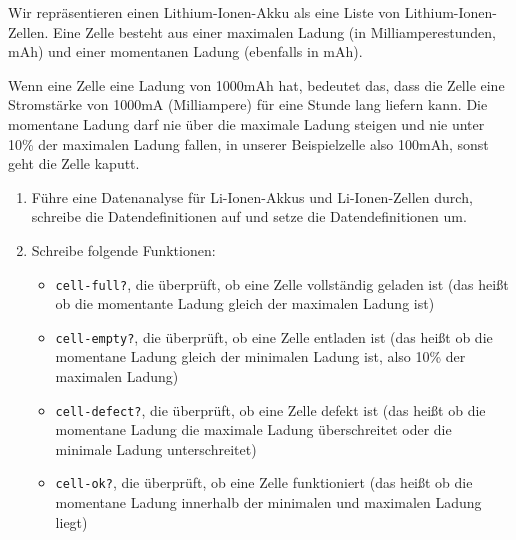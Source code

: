 \begin{aufgabe}
  Wir repräsentieren einen Lithium-Ionen-Akku als
  eine Liste von Lithium-Ionen-Zellen.  Eine Zelle besteht aus einer
  maximalen Ladung (in Milliamperestunden, mAh) und einer momentanen
  Ladung (ebenfalls in mAh).

  Wenn eine Zelle eine Ladung von 1000mAh hat, bedeutet das, dass die
  Zelle eine Stromstärke von 1000mA (Milliampere) für eine Stunde lang
  liefern kann.  Die momentane Ladung darf nie über die maximale
  Ladung steigen und nie unter 10\% der maximalen Ladung fallen, in
  unserer Beispielzelle also 100mAh, sonst geht die Zelle kaputt.

  
  \begin{enumerate}
    \setlength{\itemsep}{1cm}
  \item Führe eine Datenanalyse für Li-Ionen-Akkus und
    Li-Ionen-Zellen durch, schreibe die Datendefinitionen auf und
    setze die Datendefinitionen um.

  \item Schreibe folgende Funktionen:

    \begin{itemize}
    \item \lstinline{cell-full?}, die überprüft, ob eine
      Zelle vollständig geladen ist (das heißt ob die momentante
      Ladung gleich der maximalen Ladung ist)

    \item \lstinline{cell-empty?}, die überprüft, ob eine Zelle entladen
      ist (das heißt ob die momentane Ladung gleich der minimalen Ladung
      ist, also 10\% der maximalen Ladung)

    \item \lstinline{cell-defect?}, die überprüft, ob eine
      Zelle defekt ist (das heißt ob die momentane Ladung die
      maximale Ladung überschreitet oder die minimale Ladung
      unterschreitet)

    \item \lstinline{cell-ok?}, die überprüft, ob eine
      Zelle funktioniert (das heißt ob die momentane Ladung
      innerhalb der minimalen und maximalen Ladung liegt)

    \end{itemize}


\end{enumerate}
\end{aufgabe}
